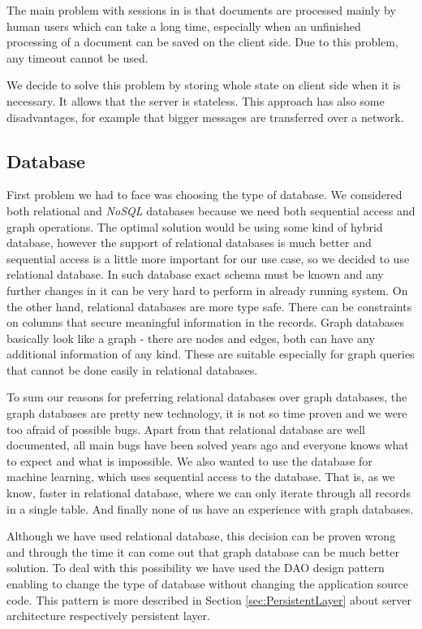 The main problem with sessions in \textan{} is that documents are processed mainly
by human users which can take a long time, especially when an unfinished processing
of a document can be saved on the client side. Due to this problem, any timeout
cannot be used.

We decide to solve this problem by storing whole state on client side when it is
necessary. It allows that the server is stateless. This approach has also some
disadvantages, for example that bigger messages are transferred over a network.

\subsection{Database}

First problem we had to face was choosing the type of database. We considered
both relational and \emph{NoSQL} databases because we need both sequential
access and graph operations. The optimal solution would be using some kind of
hybrid database, however the support of relational databases is much better
and sequential access is a little more important for our use case, so we decided
to use relational database. In such database exact schema must be known and any
further changes in it can be very hard to perform in already running
system. On the other hand, relational databases are more type safe. There can be
constraints on columns that secure meaningful information in the records. Graph
databases basically look like a graph - there are nodes and edges, both can have
any additional information of any kind. These are suitable especially for graph
queries that cannot be done easily in relational databases.

To sum our reasons for preferring relational databases over graph databases, the
graph databases are pretty new technology, it is not so time proven and we
were too afraid of possible bugs. Apart from that relational database are well
documented, all main bugs have been solved years ago and everyone knows what to
expect and what is impossible.
We also wanted to use the database for machine learning, which uses sequential
access to the database. That is, as we know, faster in relational database,
where we can only iterate through all records in a single table.
And finally none of us have an experience with graph databases.

Although we have used relational database, this decision can be proven wrong and
through the time it can come out that graph database can be much better
solution. To deal with this possibility we have used the DAO design pattern
enabling to change the type of database without changing the application source
code. This pattern is more described in Section \ref{sec:PersistentLayer} about
server architecture respectively persistent layer.

